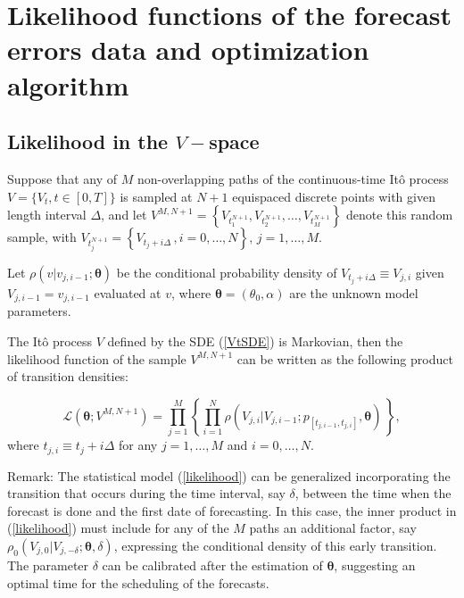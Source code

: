 \documentclass[11pt]{article}
\theoremstyle{definition}
\begin{document}



\section{ Likelihood functions of the forecast errors data and optimization algorithm} \label{Section_5} 

\subsection{Likelihood in the $V-$space}

Suppose that any of $M$ non-overlapping paths of the continuous-time It\^{o} process $V = \{ V_t, t  \in [0,T] \}$ is sampled at $N + 1$ equispaced discrete points with given length interval $\Delta$, and let $ V^{M,N + 1}=\left\{ V_{t_1^{N + 1}} , V_{t_2^{N + 1}} ,\ldots , V_{t_M^{N + 1}} \right\}$ denote this random sample, with $V_{t_j^{N + 1}} =\left\{ V_{t_j + i \Delta}\,, i = 0, \ldots, N \right\}, \, j = 1, \ldots, M$. 

Let $\rho(v \vert v_{j, i-1} ; \bm{\theta})$ be the conditional probability density of $V_{t_j + i \Delta} \equiv V_{j, i}$ given $V_{j, i-1} = v_{j, i-1}$ evaluated at $v$, where $\bm{\theta} = (\theta_0, \alpha)$ are the unknown model parameters.

The It\^{o} process $V$ defined by the SDE (\ref{VtSDE}) is Markovian, then the likelihood function of the sample $ V^{M,N + 1}$ can be written as the following product of transition densities:  

\begin{equation}
\mathcal{L}(\bm{\theta}; V^{M,N +1}) = \prod\limits_{j=1}^M \left\{ \prod\limits_{i=1}^N \rho ( {V_{j, i}| V_{j, i-1}} ; p_{[t_{j,  i-1}, t_{j , i} ]},  \bm{\theta} )  \,  \right\},
\label{likelihood}
\end{equation}
where $t_{j ,i} \equiv  t_j + i \Delta$ for any $j = 1, \ldots, M$ and $i = 0, \ldots, N$.

 {\color{red} Remark: The statistical model (\ref{likelihood}) can be generalized incorporating the transition that occurs during the time interval, say $\delta$, between the time when the forecast is done and the first date of forecasting. In this case, the inner product in  (\ref{likelihood}) must include for any of the $M$ paths an additional factor, say $\rho_0 (V_{j, 0}|V_{j, -\delta};\bm{\theta},\delta)$, expressing the conditional density of this early transition. The parameter $\delta$ can be calibrated after the estimation of $\bm{\theta}$, suggesting an optimal time for the scheduling of the forecasts.}
\end{document}
